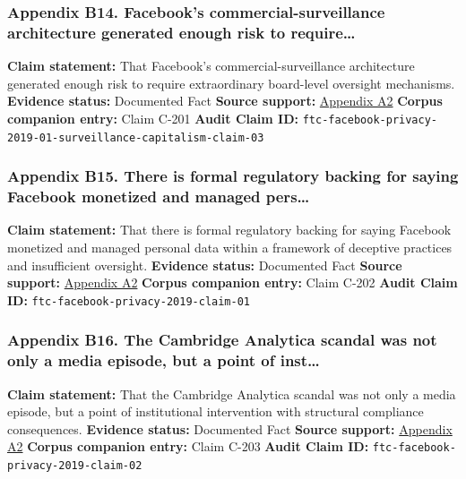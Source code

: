 \documentclass[
  american,
  11pt,
  letterpaper,
]{article}
\begin{document}
\subsubsection{Appendix B14. Facebook's commercial-surveillance
architecture generated enough risk to
require\ldots{}}\label{appendix-b14-facebooks-commercial-surveillance-architecture-generated-enough-risk-to-require}

\textbf{Claim statement:} That Facebook's commercial-surveillance
architecture generated enough risk to require extraordinary board-level
oversight mechanisms. \textbf{Evidence status:} Documented Fact
\textbf{Source support:}
\hyperref[appendix-a2-ftc-imposes-5-billion-penalty-and-sweeping-new-privacy-restrictions-on-facebook]{Appendix
A2} \textbf{Corpus companion entry:} Claim C-201 \textbf{Audit Claim
ID:}
\texttt{ftc-facebook-privacy-2019-01-surveillance-capitalism-claim-03}

\subsubsection{Appendix B15. There is formal regulatory backing for
saying Facebook monetized and managed
pers\ldots{}}\label{appendix-b15-there-is-formal-regulatory-backing-for-saying-facebook-monetized-and-managed-pers}

\textbf{Claim statement:} That there is formal regulatory backing for
saying Facebook monetized and managed personal data within a framework
of deceptive practices and insufficient oversight. \textbf{Evidence
status:} Documented Fact \textbf{Source support:}
\hyperref[appendix-a2-ftc-imposes-5-billion-penalty-and-sweeping-new-privacy-restrictions-on-facebook]{Appendix
A2} \textbf{Corpus companion entry:} Claim C-202 \textbf{Audit Claim
ID:} \texttt{ftc-facebook-privacy-2019-claim-01}

\subsubsection{Appendix B16. The Cambridge Analytica scandal was not
only a media episode, but a point of
inst\ldots{}}\label{appendix-b16-the-cambridge-analytica-scandal-was-not-only-a-media-episode-but-a-point-of-inst}

\textbf{Claim statement:} That the Cambridge Analytica scandal was not
only a media episode, but a point of institutional intervention with
structural compliance consequences. \textbf{Evidence status:} Documented
Fact \textbf{Source support:}
\hyperref[appendix-a2-ftc-imposes-5-billion-penalty-and-sweeping-new-privacy-restrictions-on-facebook]{Appendix
A2} \textbf{Corpus companion entry:} Claim C-203 \textbf{Audit Claim
ID:} \texttt{ftc-facebook-privacy-2019-claim-02}
\end{document}
